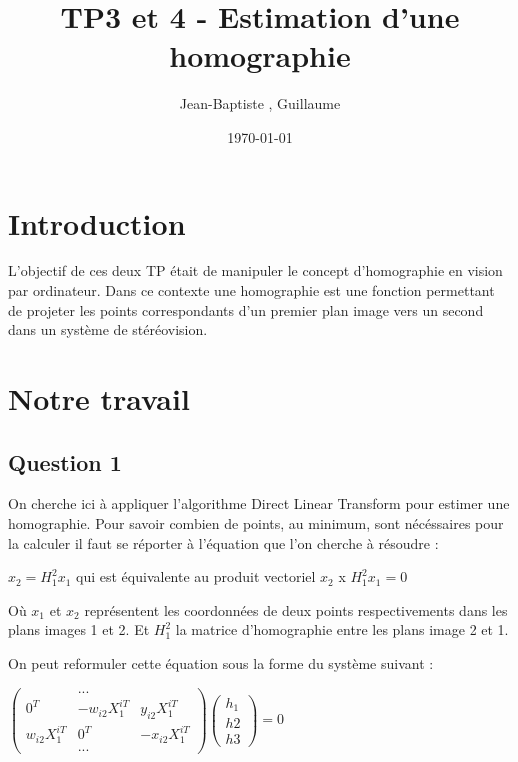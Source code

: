 \documentclass[12pt]{report}
\title{TP3 et 4 - Estimation d'une homographie}
\author{Jean-Baptiste \bsc{Morice}, Guillaume \bsc{Versal}}
\date{\today}
\begin{document}
\maketitle


\newpage
\section{Introduction}

L'objectif de ces deux TP était de manipuler le concept d'homographie en vision par ordinateur. Dans ce contexte une homographie est une fonction permettant de projeter les points correspondants d'un premier plan image vers un second dans un système de stéréovision. 

\section{Notre travail}

\subsection{Question 1}

On cherche ici à appliquer l'algorithme Direct Linear Transform pour estimer une homographie. Pour savoir combien de points, au minimum, sont nécéssaires pour la calculer il faut se réporter à l'équation que l'on cherche à résoudre :

\begin{center}
$x_2 = H^2_1x_1 $ qui est équivalente au produit vectoriel $x_2$ x $H^2_1x_1 = 0$
\end{center}


Où $x_1$ et $x_2$ représentent les coordonnées de deux points respectivements dans les plans images 1 et 2. Et $H^2_1$ la matrice d'homographie entre les plans image 2 et 1.

On peut reformuler cette équation sous la forme du système suivant :

\begin{center}
$
\begin{pmatrix}
 & ... & \\ 
0^T & -w_{i2}X_1^{iT} & y_{i2}X_1^{iT}\\ 
w_{i2}X_1^{iT} & 0^T & -x_{i2}X_1^{iT}\\
 & ... & 
\end{pmatrix}
\begin{pmatrix}
h_1\\ 
h2\\ 
h3
\end{pmatrix}
= 0
$
\end{center}
\end{document}
